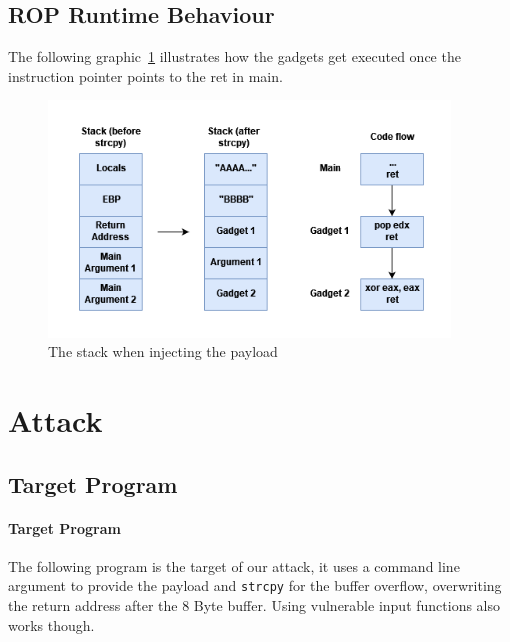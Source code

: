 \documentclass[journal=tosc,submission, notanonymous]{iacrtrans}
\begin{document}
\subsection{ROP Runtime Behaviour}
The following graphic~\cref{fig:executionatruntime} illustrates how the gadgets get executed once the instruction pointer  points to the ret in main.
\begin{figure}[h]
  \centering
  \includegraphics[width=0.95\textwidth]{Ropchaineffect.png}
  \caption{The stack when injecting the payload}
  \label{fig:executionatruntime}
\end{figure}
\section{Attack}
\label{sec:attack}
\subsection{Target Program}
\paragraph{Target Program}
The following program is the target of our attack, it uses a command line argument to provide the payload and \Verb+strcpy+ for the buffer overflow, overwriting the return address after the 8 Byte buffer. Using vulnerable input functions also works though.
\end{document}
